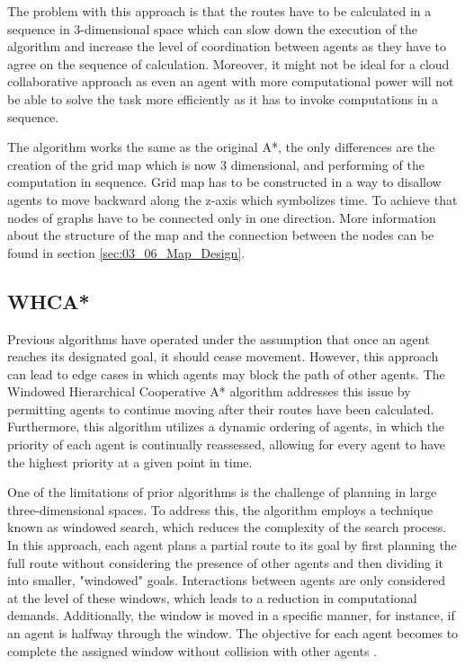 The problem with this approach is that the routes have to be calculated in a sequence in 3-dimensional space which can slow down the execution of the algorithm and increase the level of coordination between agents as they have to agree on the sequence of calculation. Moreover, it might not be ideal for a cloud collaborative approach as even an agent with more computational power will not be able to solve the task more efficiently as it has to invoke computations in a sequence.

The algorithm works the same as the original A*, the only differences are the creation of the grid map which is now 3 dimensional, and  performing of the computation in sequence. Grid map has to be constructed in a way to disallow agents to move backward along the z-axis which symbolizes time. To achieve that nodes of graphs have to be connected only in one direction. More information about the structure of the map and the connection between the nodes can be found in section \ref{sec:03_06_Map_Design}.

\subsection{WHCA*}
Previous algorithms have operated under the assumption that once an agent reaches its designated goal, it should cease movement. However, this approach can lead to edge cases in which agents may block the path of other agents. The Windowed Hierarchical Cooperative A* algorithm addresses this issue by permitting agents to continue moving after their routes have been calculated. Furthermore, this algorithm utilizes a dynamic ordering of agents, in which the priority of each agent is continually reassessed, allowing for every agent to have the highest priority at a given point in time.

One of the limitations of prior algorithms is the challenge of planning in large three-dimensional spaces. To address this, the algorithm employs a technique known as windowed search, which reduces the complexity of the search process. In this approach, each agent plans a partial route to its goal by first planning the full route without considering the presence of other agents and then dividing it into smaller, "windowed" goals. Interactions between agents are only considered at the level of these windows, which leads to a reduction in computational demands. Additionally, the window is moved in a specific manner, for instance, if an agent is halfway through the window. The objective for each agent becomes to complete the assigned window without collision with other agents \cite{whca}\cite{path_adv}.

